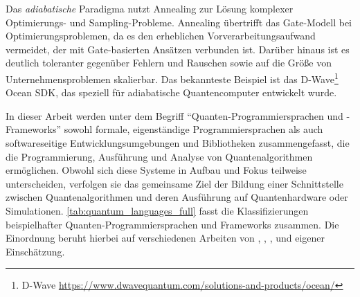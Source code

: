 Das \textit{adiabatische} Paradigma nutzt Annealing zur Lösung komplexer Optimierungs- und Sampling-Probleme. Annealing übertrifft das Gate-Modell bei Optimierungsproblemen, da es den erheblichen Vorverarbeitungsaufwand vermeidet, der mit Gate-basierten Ansätzen verbunden ist. Darüber hinaus ist es deutlich toleranter gegenüber Fehlern und Rauschen sowie auf die Größe von Unternehmensproblemen skalierbar. \autocite{albash_adiabatic_2018} Das bekannteste Beispiel ist das D-Wave\footnote{D-Wave \url{https://www.dwavequantum.com/solutions-and-products/ocean/}} Ocean SDK, das speziell für adiabatische Quantencomputer entwickelt wurde.

In dieser Arbeit werden unter dem Begriff \enquote{Quanten-Programmiersprachen und -Frameworks} sowohl formale, eigenständige Programmiersprachen als auch softwareseitige Entwicklungsumgebungen und Bibliotheken zusammengefasst, die die Programmierung, Ausführung und Analyse von Quantenalgorithmen ermöglichen. Obwohl sich diese Systeme in Aufbau und Fokus teilweise unterscheiden, verfolgen sie das gemeinsame Ziel der Bildung einer Schnittstelle zwischen Quantenalgorithmen und deren Ausführung auf Quantenhardware oder Simulationen. \autoref{tab:quantum_languages_full} fasst die Klassifizierungen beispielhafter Quanten-Programmiersprachen und Frameworks zusammen. Die Einordnung beruht hierbei auf verschiedenen Arbeiten von \autocite{singhSurveyAvailableTools2024a}, \autocite{ferreiraExploratoryStudyUsage2025}, \autocite{garhwal_quantum_2021}, \autocite{serranoQuantumSoftwareComponents2023a} und eigener Einschätzung.


